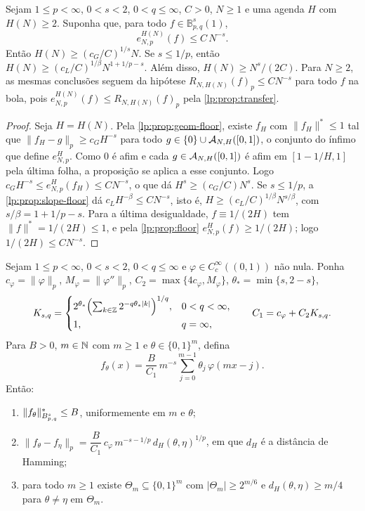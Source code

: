 \documentclass[12pt,a4paper]{article}
\begin{document}
\begin{corolario}
\label{lp:cor:joint-necessity}
Sejam $1\le p<\infty$, $0<s<2$, $0<q\le\infty$, $C>0$, $N\ge1$ e uma agenda $H$ com $H(N)\ge2$. Suponha que, para todo $f\in\mathbb B^s_{p,q}(1)$,
\[
 e^{H(N)}_{N,p}(f)\le C\,N^{-s}.
\]
Então $H(N)\ge(c_G/C)^{1/s}N$. Se $s\le1/p$, então $H(N)\ge(c_L/C)^{1/\beta}N^{1+1/p-s}$. Além disso, $H(N)\ge N^s/(2C)$. Para $N\ge2$, as mesmas conclusões seguem da hipótese $R_{N,H(N)}(f)_p\le CN^{-s}$ para todo $f$ na bola, pois $e^{H(N)}_{N,p}(f)\le R_{N,H(N)}(f)_p$ pela \cref{lp:prop:transfer}.
\end{corolario}

\begin{proof}
Seja $H=H(N)$. Pela \cref{lp:prop:geom-floor}, existe $f_H$ com $\|f_H\|^*\le1$ tal que $\|f_H-g\|_p\ge c_GH^{-s}$ para todo $g\in\{0\}\cup\mathcal A_{N,H}([0,1])$, o conjunto do ínfimo que define $e^H_{N,p}$. Como $0$ é afim e cada $g\in\mathcal A_{N,H}([0,1])$ é afim em $[1-1/H,1]$ pela última folha, a proposição se aplica a esse conjunto. Logo $c_GH^{-s}\le e^H_{N,p}(f_H)\le CN^{-s}$, o que dá $H^s\ge(c_G/C)N^s$. Se $s\le1/p$, a \cref{lp:prop:slope-floor} dá $c_LH^{-\beta}\le CN^{-s}$, isto é, $H\ge(c_L/C)^{1/\beta}N^{s/\beta}$, com $s/\beta=1+1/p-s$. Para a última desigualdade, $f\equiv1/(2H)$ tem $\|f\|^*=1/(2H)\le1$, e pela \cref{lp:prop:floor} $e^H_{N,p}(f)\ge1/(2H)$; logo $1/(2H)\le CN^{-s}$.
\end{proof}

\begin{lema}
\label{lp:lem:packing}
Sejam $1\le p<\infty$, $0<s<2$, $0<q\le\infty$ e $\varphi\in C_c^\infty((0,1))$ não nula. Ponha $c_\varphi=\|\varphi\|_p$, $M_\varphi=\|\varphi''\|_p$, $C_2=\max\{4c_\varphi,M_\varphi\}$, $\theta_*=\min\{s,2-s\}$,
\[
K_{s,q}=\begin{cases}2^{\theta_*}\Bigl(\sum_{k\in\mathbb Z}2^{-q\theta_*|k|}\Bigr)^{1/q}, & 0<q<\infty,\\[4pt] 1, & q=\infty,\end{cases}
\qquad
C_1=c_\varphi+C_2K_{s,q}.
\]
Para $B>0$, $m\in\mathbb N$ com $m\ge1$ e $\theta\in\{0,1\}^m$, defina
\[
f_\theta(x)=\frac{B}{C_1}\,m^{-s}\sum_{j=0}^{m-1}\theta_j\,\varphi(mx-j).
\]
Então:
\begin{enumerate}[label=(\roman*)]
\item $\|f_\theta\|^*_{B^{s}_{p,q}}\le B$, uniformemente em $m$ e $\theta$;
\item $\|f_\theta-f_\eta\|_p=\dfrac{B}{C_1}\,c_\varphi\,m^{-s-1/p}\,d_H(\theta,\eta)^{1/p}$, em que $d_H$ é a distância de Hamming;
\item para todo $m\ge1$ existe $\Theta_m\subseteq\{0,1\}^m$ com $|\Theta_m|\ge 2^{m/6}$ e $d_H(\theta,\eta)\ge m/4$ para $\theta\ne\eta$ em $\Theta_m$.
\end{enumerate}
\end{lema}
\end{document}
